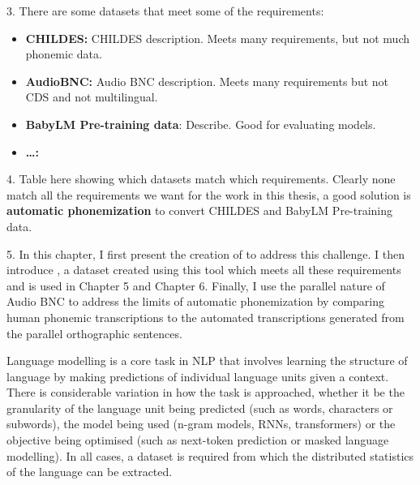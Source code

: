 \begin{roughdraft}
3. There are some datasets that meet some of the requirements:
\begin{itemize}
    \item \textbf{CHILDES:} CHILDES description. Meets many requirements, but not much phonemic data. 
    \item \textbf{AudioBNC:} Audio BNC description. Meets many requirements but not CDS and not multilingual. 
    \item \textbf{BabyLM Pre-training data}: Describe. Good for evaluating models. 
    \item \textbf{\ldots:} 
\end{itemize}

4. Table here showing which datasets match which requirements. Clearly none match all the requirements we want for the work in this thesis, a good solution is \textbf{automatic phonemization} to convert CHILDES and BabyLM Pre-training data.

5. In this chapter, I first present the creation of \corpusphonemizer to address this challenge. I then introduce \phonemizedchildes, a dataset created using this tool which meets all these requirements and is used in Chapter 5 and Chapter 6. Finally, I use the parallel nature of Audio BNC to address the limits of automatic phonemization by comparing human phonemic transcriptions to the automated transcriptions generated from the parallel orthographic sentences.
\end{roughdraft}

Language modelling is a core task in NLP that involves learning the structure of language by making predictions of individual language units given a context. There is considerable variation in how the task is approached, whether it be the granularity of the language unit being predicted (such as words, characters or subwords), the model being used (n-gram models, RNNs, transformers) or the objective being optimised (such as next-token prediction or masked language modelling). In all cases, a dataset is required from which the distributed statistics of the language can be extracted.


